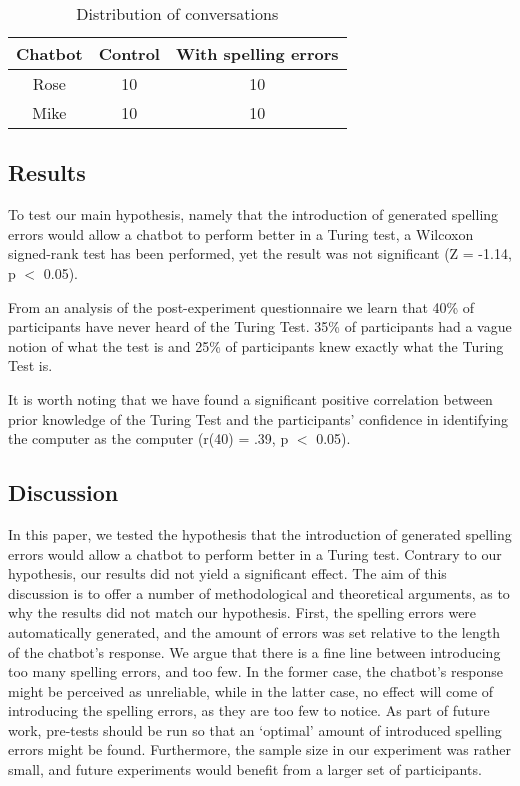 \begin{table}[!ht]
   \begin{center}
      \caption{Distribution of conversations}
      \label{tabdistributionofconversations}
      \vskip 0.12in
      \begin{tabular}[center]{| c | c | c |}
         \hline
         Chatbot & Control & With spelling errors \\
         \hline \hline
         Rose & 10 & 10\\
         Mike & 10 & 10\\
         \hline
      \end{tabular}
   \end{center}
\end{table}

\subsection{Results}
To test our main hypothesis, namely that the introduction of generated spelling errors would allow a chatbot to perform better in a Turing test, a Wilcoxon signed-rank test has been performed, yet the result was not significant (Z = -1.14, p $<$ 0.05).

From an analysis of the post-experiment questionnaire we learn that 40\% of participants have never heard of the Turing Test. 35\% of participants had a vague notion of what the test is and 25\% of participants knew exactly what the Turing Test is.

It is worth noting that we have found a significant positive correlation between prior knowledge of the Turing Test and the participants’ confidence in identifying the computer as the computer (r(40) = .39, p $<$ 0.05).

\subsection{Discussion}
In this paper, we tested the hypothesis that the introduction of generated spelling errors would allow a chatbot to perform better in a Turing test. Contrary to our hypothesis, our results did not yield a significant effect. The aim of this discussion is to offer a number of methodological and theoretical arguments, as to why the results did not match our hypothesis. First, the spelling errors were automatically generated, and the amount of errors was set relative to the length of the chatbot’s response. We argue that there is a fine line between introducing too many spelling errors, and too few. In the former case, the chatbot’s response might be perceived as unreliable, while in the latter case, no effect will come of introducing the spelling errors, as they are too few to notice. As part of future work, pre-tests should be run so that an ‘optimal’ amount of introduced spelling errors might be found. Furthermore, the sample size in our experiment was rather small, and future experiments would benefit from a larger set of participants.

